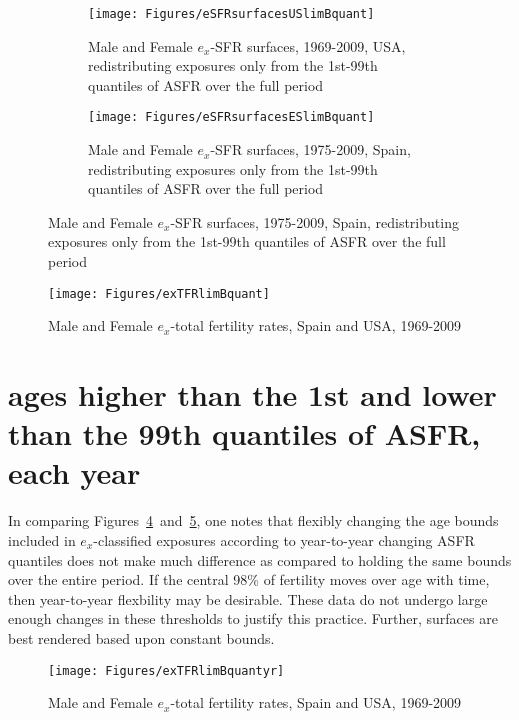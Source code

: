 \begin{figure}[ht!]
        \centering
        \begin{subfigure}
                \centering
                \caption{Male and Female $e_x$-SFR surfaces, 1969-2009, USA,
                redistributing exposures only from the 1st-99th quantiles of
                ASFR over the full period}
                \texttt{[image: Figures/eSFRsurfacesUSlimBquant]}
                \label{fig:exSFRsurfUSlimBquant}
        \end{subfigure}
        \begin{subfigure}
                \centering
                \caption{Male and Female $e_x$-SFR surfaces, 1975-2009, Spain,
                redistributing exposures only from the 1st-99th quantiles of
                ASFR over the full period}
                \texttt{[image: Figures/eSFRsurfacesESlimBquant]} 
                \label{fig:exSFRsurfESlimBquant}
        \end{subfigure}
\end{figure}

\begin{figure}[ht!]
        \centering  
          \caption{Male and Female $e_x$-total fertility rates, Spain
          and USA, 1969-2009}
           \texttt{[image: Figures/exTFRlimBquant]}
          \label{fig:exTFRlimBquant}
\end{figure}
\pagebreak

\section{ages higher than the 1st and lower than the 99th quantiles of ASFR,
each year}

In comparing Figures~\ref{fig:exTFRlimBquant}~and~\ref{fig:exTFRlimBquantyr},
one notes that flexibly changing the age bounds included in $e_x$-classified
exposures according to year-to-year changing ASFR quantiles does not make much
difference as compared to holding the same bounds over the entire period. If
the central 98\% of fertility moves over age with time, then year-to-year
flexbility may be desirable. These data do not undergo large enough changes in
these thresholds to justify this practice. Further, surfaces are best rendered
based upon constant bounds.

 \begin{figure}[ht!]
        \centering  
          \caption{Male and Female $e_x$-total fertility rates, Spain
          and USA, 1969-2009}
           \texttt{[image: Figures/exTFRlimBquantyr]}
          \label{fig:exTFRlimBquantyr}
\end{figure}
